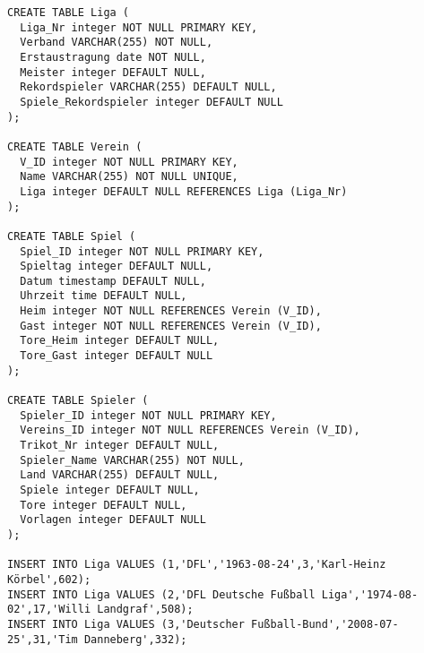 \documentclass{bschlangaul-aufgabe}
\begin{document}
\begin{verbatim}
CREATE TABLE Liga (
  Liga_Nr integer NOT NULL PRIMARY KEY,
  Verband VARCHAR(255) NOT NULL,
  Erstaustragung date NOT NULL,
  Meister integer DEFAULT NULL,
  Rekordspieler VARCHAR(255) DEFAULT NULL,
  Spiele_Rekordspieler integer DEFAULT NULL
);

CREATE TABLE Verein (
  V_ID integer NOT NULL PRIMARY KEY,
  Name VARCHAR(255) NOT NULL UNIQUE,
  Liga integer DEFAULT NULL REFERENCES Liga (Liga_Nr)
);

CREATE TABLE Spiel (
  Spiel_ID integer NOT NULL PRIMARY KEY,
  Spieltag integer DEFAULT NULL,
  Datum timestamp DEFAULT NULL,
  Uhrzeit time DEFAULT NULL,
  Heim integer NOT NULL REFERENCES Verein (V_ID),
  Gast integer NOT NULL REFERENCES Verein (V_ID),
  Tore_Heim integer DEFAULT NULL,
  Tore_Gast integer DEFAULT NULL
);

CREATE TABLE Spieler (
  Spieler_ID integer NOT NULL PRIMARY KEY,
  Vereins_ID integer NOT NULL REFERENCES Verein (V_ID),
  Trikot_Nr integer DEFAULT NULL,
  Spieler_Name VARCHAR(255) NOT NULL,
  Land VARCHAR(255) DEFAULT NULL,
  Spiele integer DEFAULT NULL,
  Tore integer DEFAULT NULL,
  Vorlagen integer DEFAULT NULL
);

INSERT INTO Liga VALUES (1,'DFL','1963-08-24',3,'Karl-Heinz Körbel',602);
INSERT INTO Liga VALUES (2,'DFL Deutsche Fußball Liga','1974-08-02',17,'Willi Landgraf',508);
INSERT INTO Liga VALUES (3,'Deutscher Fußball-Bund','2008-07-25',31,'Tim Danneberg',332);


\end{verbatim}
\end{document}
